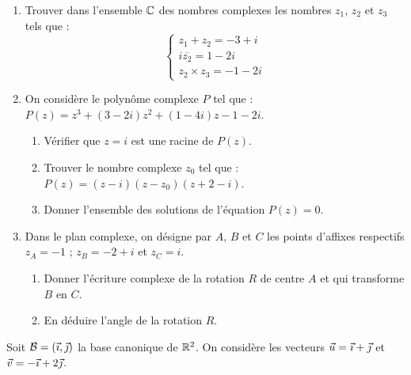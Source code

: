 \documentclass[11pt]{article}
\begin{document}


\begin{enumerate}
  \item Trouver dans l'ensemble $\mathbb{C}$ des nombres complexes les nombres $z_1$, $z_2$ et $z_3$ tels que :
  \[ \begin{cases} z_1 + z_2 = -3 + i \\ i\overline{z_2} = 1 - 2i \\ z_2 \times z_3 = -1 - 2i \end{cases} \]
  \item On considère le polynôme complexe $P$ tel que : $P(z) = z^3 + (3 - 2i)z^2 + (1 - 4i)z - 1 - 2i$.
  \begin{enumerate}[label=\alph*.]
    \item Vérifier que $z = i$ est une racine de $P(z)$.
    \item Trouver le nombre complexe $z_0$ tel que : $P(z) = (z - i)(z - z_0)(z + 2 - i)$.
    \item Donner l'ensemble des solutions de l'équation $P(z) = 0$.
  \end{enumerate}
  \item Dans le plan complexe, on désigne par $A$, $B$ et $C$ les points d'affixes respectifs $z_A = -1$ ; $z_B = -2 + i$ et $z_C = i$.
  \begin{enumerate}[label=\alph*.]
    \item Donner l'écriture complexe de la rotation $R$ de centre $A$ et qui transforme $B$ en $C$.
    \item En déduire l'angle de la rotation $R$.
  \end{enumerate}
\end{enumerate}


Soit $\mathcal{B} = (\vec{\imath},\vec{\jmath})$ la base canonique de $\mathbb{R}^2$. On considère les vecteurs $\vec{u} = \vec{\imath} + \vec{\jmath}$ et $\vec{v} = -\vec{\imath} + 2\vec{\jmath}$.
\end{document}
